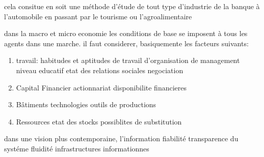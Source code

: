\documentclass{article}
\begin{document}
cela consitue en soit une méthode d'étude de tout type d'industrie de la banque à l'automobile en passant par le tourisme ou l'agroalimentaire


dans la macro et micro economie 
les conditions de base se imposent à tous les agents dans une marche. il faut considerer, basiquemente les facteurs suivants:
\begin{enumerate}
    \item travail: 
        habitudes et aptitudes de travail d'organisation
        de management
        niveau educatif
        etat des relations sociales
        negociation
    \item Capital Financier
        actionnariat
        disponibilite financieres
    \item Bâtiments
        technologies
        outils de productions
    \item Ressources
        etat des stocks
        possiblites de substitution
\end{enumerate}

dans une vision plus contemporaine, l'information fiabilité transparence du systéme fluidité infrastructures informationnes
\end{document}
